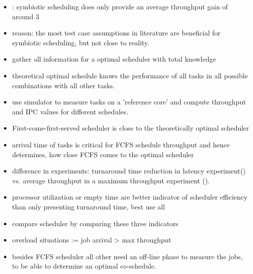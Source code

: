 \begin{itemize}
\begin{itemize}
      \item {}: symbiotic scheduling does only
	provide an average throughput gain of around 3%
      \item reason: the most test case assumptions in literature are beneficial
	for symbiotic scheduling, but not close to reality.
      \item gather all information for a optimal scheduler with total knowledge
      \item theoretical optimal schedule knows the performance of all tasks in
	all possible combinations with all other tasks.
      \item use simulator to measure tasks on a 'reference core' and
	compute throughput and IPC values for different schedules.
      \item First-come-first-served scheduler is close to the theoretically
	optimal scheduler
      \item arrival time of tasks is critical for FCFS schedule throughput and
	hence determines, how close FCFS comes to the optimal scheduler
      \item difference in experiments: turnaround time reduction in latency
	experiment(\cite{snavely_symbiotic_2000}) vs. average throughput in a
	maximum throughput experiment (\cite{eyerman_revisiting_2015}).
      \item processor utilization or empty time are better indicator of
	scheduler efficiency than only presenting turnaround time, best use all
      \item compare scheduler by comparing these three indicators
      \item overload situations := job arrival > max throughput
      \item besides FCFS scheduler all other need an off-line phase to measure
	the jobs, to be able to determine an optimal co-schedule.
    \end{itemize}


\end{itemize}
